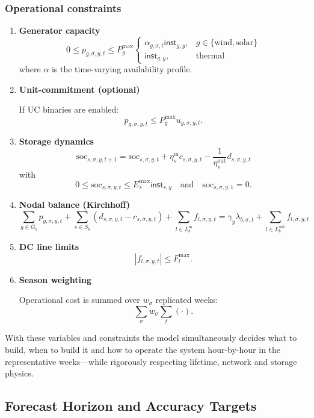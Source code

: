 \subsubsection{Operational constraints}
\begin{enumerate}
    \item \textbf{Generator capacity}
    \[
    0\le p_{g,\sigma,y,t}\le P^{\max}_g
    \begin{cases}
    \alpha_{g,\sigma,t}\textsf{inst}_{g,y}, & g\in\{\text{wind},\text{solar}\}\\
    \textsf{inst}_{g,y}, & \text{thermal}
    \end{cases}
    \]
    where $\alpha$ is the time-varying availability profile.
    \item \textbf{Unit-commitment (optional)}
    
    If UC binaries are enabled:
    \[
    p_{g,\sigma,y,t}\le P^{\max}_g u_{g,\sigma,y,t}.
    \]
    \item \textbf{Storage dynamics}
    \[
    \text{soc}_{s,\sigma,y,t+1}=
    \text{soc}_{s,\sigma,y,t}+\eta^{\text{in}}_s c_{s,\sigma,y,t}
    -\frac{1}{\eta^{\text{out}}_s}d_{s,\sigma,y,t}
    \]
    with
    \[
    0\le\text{soc}_{s,\sigma,y,t}\le E^{\max}_s\textsf{inst}_{s,y}\quad\text{and}\quad
    \text{soc}_{s,\sigma,y,1}=0.
    \]
    \item \textbf{Nodal balance (Kirchhoff)}
    \[
    \sum_{g\in G_b} p_{g,\sigma,y,t}
    +\sum_{s\in S_b} (d_{s,\sigma,y,t}-c_{s,\sigma,y,t})
    +\sum_{l\in L^{\text{in}}_b} f_{l,\sigma,y,t}
    = \gamma_y \lambda_{b,\sigma,t}
    +\sum_{l\in L^{\text{out}}_b} f_{l,\sigma,y,t}
    \]
    \item \textbf{DC line limits}
    \[
    |f_{l,\sigma,y,t}|\le F^{\max}_l.
    \]
    \item \textbf{Season weighting}
    
    Operational cost is summed over $w_\sigma$ replicated weeks:
    \[
    \sum_{\sigma} w_\sigma\sum_t (\cdot).
    \]
\end{enumerate}

With these variables and constraints the model simultaneously decides what to build, when to build it and how to operate the system hour-by-hour in the representative weeks—while rigorously respecting lifetime, network and storage physics.

\subsection{Forecast Horizon and Accuracy Targets}
\label{sec:forecast-horizon}

